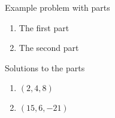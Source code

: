 \begin{exercises}
	\begin{problist}
		\prob  Example problem with parts
		\begin{enumerate}
			\item   The first part
			\item   The second part
		\end{enumerate}
		\begin{solution}
		Solutions to the parts
			\begin{enumerate}
				\item   $(2,4,8)$
				\item   $(15,6,-21)$
			\end{enumerate}
		\end{solution}

	\end{problist}
\end{exercises}
